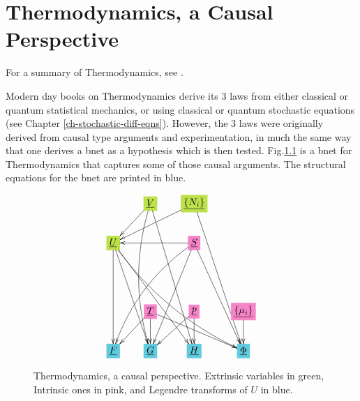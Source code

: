 \chapter{Thermodynamics, a Causal Perspective}
\label{ch-thermo}

For a summary of Thermodynamics, see
\cite{wiki-thermo}.

Modern day books on Thermodynamics
derive its 3 laws from either classical
or quantum statistical mechanics, or using classical or quantum stochastic  equations
(see Chapter \ref{ch-stochastic-diff-eqns}). However,
the 3 laws
were originally derived from causal type
	arguments and experimentation, in much
	the same way that one  derives a bnet
	as a hypothesis which is then tested.
Fig.\ref{fig-texnn-for-thermo} is a bnet for Thermodynamics that
captures some of those causal arguments.
The structural equations for the bnet are printed in blue.

	


\begin{figure}[h!]\centering
	$$\xymatrix{
		&*+[F*:SpringGreen]{\underline{V}}\ar@/_1pc/[dddd]\ar[ddddr]\ar[dl]&*+[F*:SpringGreen]{\underline{\{N_i\}}}\ar[ddddr]\ar[dll]&
		\\
		*+[F*:SpringGreen]{\underline{U}}\ar@/_1pc/[dddrrr]\ar[ddd]\ar[dddr]\ar[dddrr]&&*+[F*:Lavender]{\underline{S}}\ar[dddr]\ar@/_1pc/[dddll]\ar[dddl]\ar[ll]&
		\\
		&&&
		\\
		&*+[F*:Lavender]{\underline{T}}\ar[drr]\ar[dl]\ar[d]&*+[F*:Lavender]{\underline{p}}\ar[dl]\ar[d]&*+[F*:Lavender]{\underline{\{\mu_i\}}}\ar[d]
		\\
		*+[F*:SkyBlue]{\underline{F}}&*+[F*:SkyBlue]{\underline{G}}&*+[F*:SkyBlue]{\underline{H}}&*+[F*:SkyBlue]{\underline{\Phi}}
	}$$
	\caption{Thermodynamics, a causal perspective. Extrinsic variables in green, Intrinsic ones in pink, and Legendre  transforms of $U$ in blue.}
	\label{fig-texnn-for-thermo}
\end{figure}

